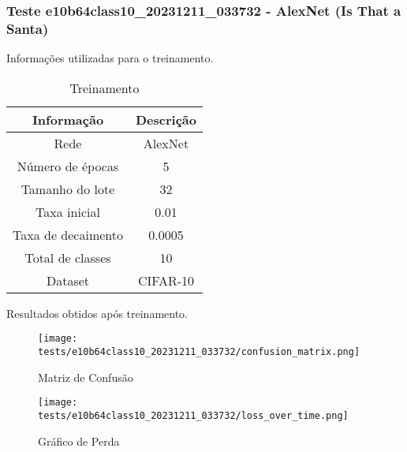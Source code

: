 \subsubsection{Teste e10b64class10_20231211_033732 - AlexNet (Is That a Santa)}

Informações utilizadas para o treinamento.

\begin{table}[ht]
   \centering
   \caption{Treinamento}
   \label{tab:modelos}
   \begin{tabular}{| c | c | }
      \hline 
      \textbf{Informação} & \textbf{Descrição} \\
      \hline \hline 
      Rede & AlexNet \\
      \hline
      Número de épocas & 5\\
      \hline
      Tamanho do lote & 32\\
      \hline
      Taxa inicial & 0.01 \\
      \hline
      Taxa de decaimento & 0.0005 \\
      \hline
      Total de classes & 10\\
      \hline
      Dataset & CIFAR-10\\
      \hline
   \end{tabular} 
\end{table}

Resultados obtidos após treinamento.


\begin{figure}[ht]
 \begin{center}
   \texttt{[image: tests/e10b64class10\_20231211\_033732/confusion\_matrix.png]}
  \caption{Matriz de Confusão}
  \label{fig:fig03}
 \end{center}
\end{figure}

\begin{figure}[ht]
 \begin{center}
   \texttt{[image: tests/e10b64class10\_20231211\_033732/loss\_over\_time.png]}
  \caption{Gráfico de Perda}
  \label{fig:fig04}
 \end{center}
\end{figure}
